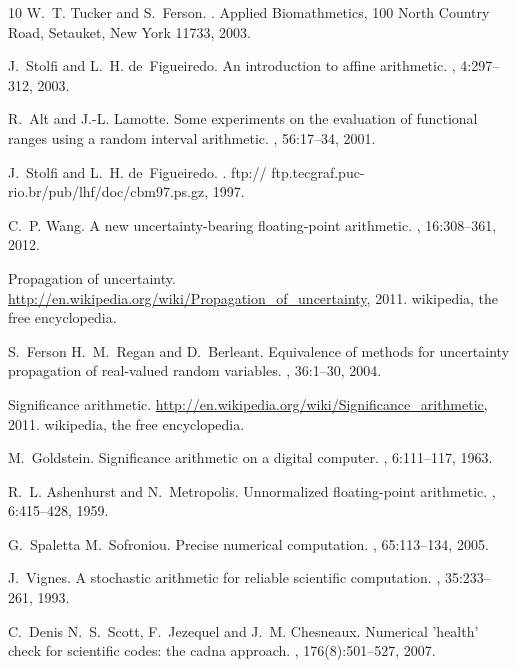 \documentclass[twoside]{article}
\numberwithin{equation}{section}
\begin{document}
\begin{thebibliography}{10}
W.~T. Tucker and S.~Ferson.
.
\newblock Applied Biomathmetics, 100 North Country Road, Setauket, New York
  11733, 2003.

J.~Stolfi and L.~H. de~Figueiredo.
\newblock An introduction to affine arithmetic.
, 4:297--312, 2003.

R.~Alt and J.-L. Lamotte.
\newblock Some experiments on the evaluation of functional ranges using a
  random interval arithmetic.
, 56:17--34, 2001.

J.~Stolfi and L.~H. de~Figueiredo.
.
\newblock ftp:// ftp.tecgraf.puc-rio.br/pub/lhf/doc/cbm97.ps.gz, 1997.

C.~P. Wang.
\newblock A new uncertainty-bearing floating-point arithmetic.
, 16:308--361, 2012.

Propagation of uncertainty.
\newblock \url{http://en.wikipedia.org/wiki/Propagation_of_uncertainty}, 2011.
\newblock wikipedia, the free encyclopedia.

S.~Ferson H.~M.~Regan and D.~Berleant.
\newblock Equivalence of methods for uncertainty propagation of real-valued
  random variables.
, 36:1--30, 2004.

Significance arithmetic.
\newblock \url{http://en.wikipedia.org/wiki/Significance_arithmetic}, 2011.
\newblock wikipedia, the free encyclopedia.

M.~Goldstein.
\newblock Significance arithmetic on a digital computer.
, 6:111--117, 1963.

R.~L. Ashenhurst and N.~Metropolis.
\newblock Unnormalized floating-point arithmetic.
, 6:415--428, 1959.

G.~Spaletta M.~Sofroniou.
\newblock Precise numerical computation.
, 65:113–134,
  2005.

J.~Vignes.
\newblock A stochastic arithmetic for reliable scientific computation.
, 35:233--261, 1993.

C.~Denis N.~S.~Scott, F.~Jezequel and J.~M. Chesneaux.
\newblock Numerical 'health' check for scientific codes: the cadna approach.
, 176(8):501--527, 2007.

\end{thebibliography}

\else


\fi
\end{document}
